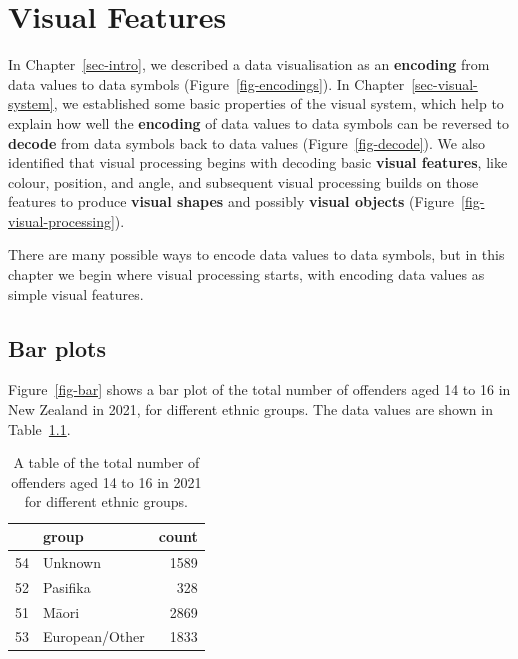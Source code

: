 \documentclass[
  letterpaper,
  DIV=11,
  numbers=noendperiod]{scrreprt}
\begin{document}
\theendnotes


\chapter{Visual Features}\label{sec-encoding-visual-features}

In Chapter~\ref{sec-intro}, we described a data visualisation as an
\textbf{encoding} from data values to data symbols
(Figure~\ref{fig-encodings}). In Chapter~\ref{sec-visual-system}, we
established some basic properties of the visual system, which help to
explain how well the \textbf{encoding} of data values to data symbols
can be reversed to \textbf{decode} from data symbols back to data values
(Figure~\ref{fig-decode}). We also identified that visual processing
begins with decoding basic \textbf{visual features}, like colour,
position, and angle, and subsequent visual processing builds on those
features to produce \textbf{visual shapes} and possibly \textbf{visual
objects} (Figure~\ref{fig-visual-processing}).

There are many possible ways to encode data values to data symbols, but
in this chapter we begin where visual processing starts, with encoding
data values as simple visual features.

\section{Bar plots}\label{sec-bar}

Figure~\ref{fig-bar} shows a bar plot of the total number of offenders
aged 14 to 16 in New Zealand in 2021, for different ethnic groups. The
data values are shown in Table~\ref{tbl-crime-group-total}.

\begin{longtable}[t]{llr}

\caption{\label{tbl-crime-group-total}A table of the total number of
offenders aged 14 to 16 in 2021 for different ethnic groups.}

\tabularnewline

\toprule
 & group & count\\
\midrule
54 & Unknown & 1589\\
52 & Pasifika & 328\\
51 & Māori & 2869\\
53 & European/Other & 1833\\
\bottomrule

\end{longtable}
\end{document}
